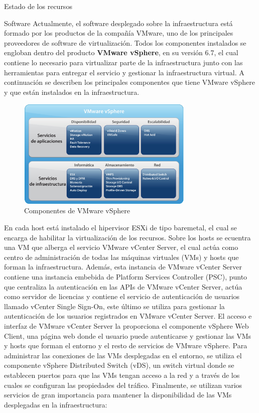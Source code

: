 \begin{chapter}{Estado de los recursos}
\begin{section}{Software}
    \label{subsec:softwareinstalado}
    Actualmente, el software desplegado sobre la infraestructura está formado por los productos de la compañía VMware, uno de los principales proveedores de software de virtualización. Todos los componentes instalados se engloban dentro del producto \textbf{VMware vSphere}, en su versión 6.7, el cual contiene lo necesario para virtualizar parte de la infraestructura junto con las herramientas para entregar el servicio y gestionar la infraestructura virtual. A continuación	se describen los principales componentes que tiene VMware vSphere y que están instalados en la infraestructura.
    \begin{figure}[h]
        \centering
        \includegraphics[width=0.75\textwidth]{imaxes/cap2recursos/contentVSphere}
        \caption{Componentes de VMware vSphere\cite{fotovSphere}}
        \label{fig:vSphere-components}
    \end{figure}
    \FloatBarrier
    En cada host está instalado el hipervisor ESXi de tipo baremetal, el cual se encarga de habilitar la virtualización de los recursos. Sobre los hosts se ecuentra una VM que alberga el servicio VMware vCenter Server, el cual actúa como centro de administración de todas las máquinas virtuales (VMs) y hosts que forman la infraestructura. Además, esta instancia de VMware vCenter Server contiene una instancia embebida de Platform Services Controller (PSC), punto que centraliza la autenticación en las APIs de VMware vCenter Server, actúa como servidor de licencias y contiene el servicio de autenticación de usuarios llamado vCenter Single Sign-On, este último se utiliza para gestionar la autenticación de los usuarios registrados en VMware vCenter Server. El acceso e interfaz de VMware vCenter Server la proporciona el componente vSphere Web Client, una página web donde el usuario puede autenticarse y gestionar las VMs y hosts que forman el entorno y el resto de servicios de VMware vSphere. Para administrar las conexiones de las VMs desplegadas en el entorno, se utiliza el componente vSphere Distributed Switch (vDS), un switch virtual donde se establecen puertos para que las VMs tengan acceso a la red y a través de los cuales se configuran las propiedades del tráfico. Finalmente, se utilizan varios servicios de gran importancia para mantener la disponibilidad de las VMs desplegadas en la infraestructura:

\end{section}
\end{chapter}
